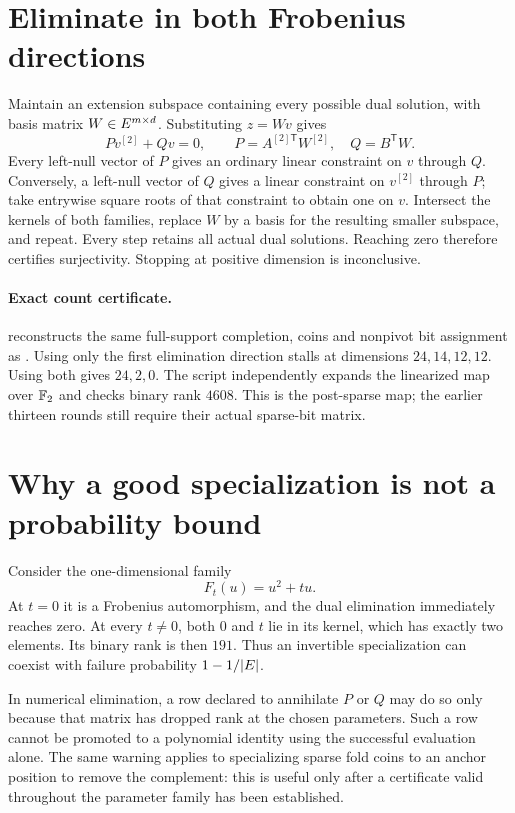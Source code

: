 \documentclass[11pt]{article}
\begin{document}
\section{Eliminate in both Frobenius directions}

Maintain an extension subspace containing every possible dual solution, with basis matrix $W\in E^{m\times d}$. Substituting $z=Wv$ gives
\[
 Pv^{[2]}+Qv=0,\qquad
 P=A^{[2]\mathsf T}W^{[2]},\quad Q=B^{\mathsf T}W.
\]
Every left-null vector of $P$ gives an ordinary linear constraint on $v$ through $Q$. Conversely, a left-null vector of $Q$ gives a linear constraint on $v^{[2]}$ through $P$; take entrywise square roots of that constraint to obtain one on $v$. Intersect the kernels of both families, replace $W$ by a basis for the resulting smaller subspace, and repeat. Every step retains all actual dual solutions. Reaching zero therefore certifies surjectivity. Stopping at positive dimension is inconclusive.

\paragraph{Exact count certificate.}  reconstructs the same full-support completion, coins and nonpivot bit assignment as . Using only the first elimination direction stalls at dimensions $24,14,12,12$. Using both gives $24,2,0$. The script independently expands the linearized map over $\mathbb{F}_2$ and checks binary rank $4608$. This is the post-sparse map; the earlier thirteen rounds still require their actual sparse-bit matrix.

\section{Why a good specialization is not a probability bound}

Consider the one-dimensional family
\[
 F_t(u)=u^2+tu.
\]
At $t=0$ it is a Frobenius automorphism, and the dual elimination immediately reaches zero. At every $t\ne0$, both $0$ and $t$ lie in its kernel, which has exactly two elements. Its binary rank is then $191$. Thus an invertible specialization can coexist with failure probability $1-1/|E|$.

In numerical elimination, a row declared to annihilate $P$ or $Q$ may do so only because that matrix has dropped rank at the chosen parameters. Such a row cannot be promoted to a polynomial identity using the successful evaluation alone. The same warning applies to specializing sparse fold coins to an anchor position to remove the complement: this is useful only after a certificate valid throughout the parameter family has been established.
\end{document}
